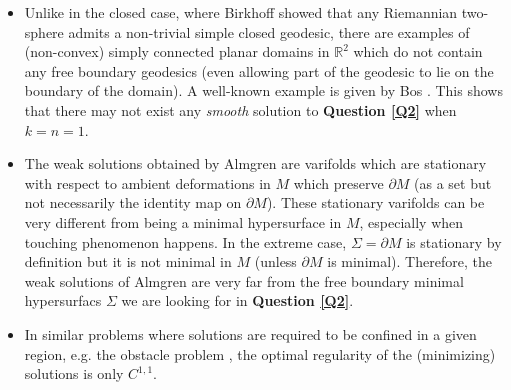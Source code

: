 \documentclass[10pt]{amsart}
\theoremstyle{definition}
\theoremstyle{remark}
\numberwithin{equation}{section}
\newcommand{\R}{\mathbb{R}}
\begin{document}
\begin{itemize}
\item[(1)] Unlike in the closed case, where Birkhoff \cite{Birkhoff17} showed that any Riemannian two-sphere admits a non-trivial simple closed geodesic, there are examples of (non-convex) simply connected planar domains in $\R^2$ which do not contain any free boundary geodesics (even allowing part of the geodesic to lie on the boundary of the domain). A well-known example is given by Bos \cite{Bos63}. This shows that there may not exist any \emph{smooth} solution to \textbf{Question \ref{Q2}} when $k=n=1$.
\item[(2)] The weak solutions obtained by Almgren \cite{Almgren65} are varifolds which are stationary with respect to ambient deformations in $M$ which preserve $\partial M$ (as a set but not necessarily the identity map on $\partial M$). These stationary varifolds can be very different from being a minimal hypersurface in $M$, especially when touching phenomenon happens. In the extreme case, $\Sigma=\partial M$ is stationary by definition but it is not minimal in $M$ (unless $\partial M$ is minimal). Therefore, the weak solutions of Almgren are very far from the free boundary minimal hypersurfacs $\Sigma$ we are looking for in \textbf{Question \ref{Q2}}.
\item[(3)] In similar problems where solutions are required to be confined in a given region, e.g. the obstacle problem \cite{Caffarelli98}, the optimal regularity of the (minimizing) solutions is only $C^{1,1}$.
\end{itemize}

\end{document}
